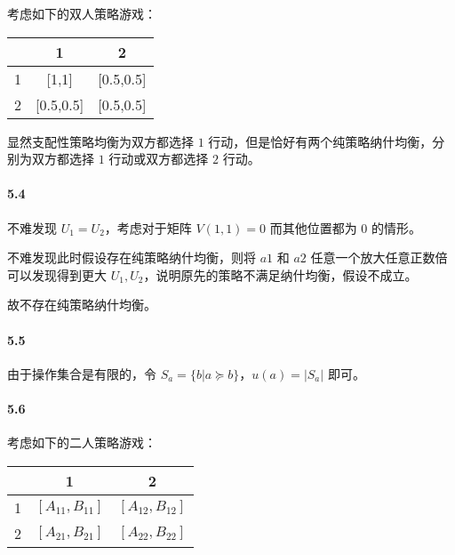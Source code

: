 \documentclass[12pt, a4paper, oneside]{ctexart}
\begin{document}
	 考虑如下的双人策略游戏：
	 
	 \begin{table}[htbp]
	 	\centering
	 	\begin{tabular}{|c|c|c|}
	 		\toprule
	 		& 1     & 2 \\
	 		\midrule
	 		1     & [1,1] & [0.5,0.5] \\
	 		\midrule
	 		2     & [0.5,0.5] & [0.5,0.5] \\
	 		\bottomrule
	 	\end{tabular}%
	 	\label{tab:addlabel}%
	 \end{table}%
	 
	显然支配性策略均衡为双方都选择 $1$ 行动，但是恰好有两个纯策略纳什均衡，分别为双方都选择 $1$ 行动或双方都选择 $2$ 行动。
	
	\paragraph{5.4} 
	
	不难发现 $U_1=U_2$，考虑对于矩阵 $V(1,1)=0$ 而其他位置都为 $0$ 的情形。
	
	不难发现此时假设存在纯策略纳什均衡，则将 $a1$ 和 $a2$ 任意一个放大任意正数倍可以发现得到更大 $U_1,U_2$，说明原先的策略不满足纳什均衡，假设不成立。
	
	故不存在纯策略纳什均衡。
	
	\paragraph{5.5}
	
	由于操作集合是有限的，令 $S_a=\{b|a\succeq b\}$，$u(a)=|S_a|$ 即可。
	
	\paragraph{5.6}
	
	考虑如下的二人策略游戏：
	\begin{table}[htbp]
		\centering
		\begin{tabular}{|c|c|c|}
			\toprule
			& 1     & 2 \\
			\midrule
			1     & $[A_{11},B_{11}]$ & $[A_{12},B_{12}]$ \\
			\midrule
			2     & $[A_{21},B_{21}]$ & $[A_{22},B_{22}]$ \\
			\bottomrule
		\end{tabular}%
		
		\label{tab:addlabel}%
	\end{table}%
	
\end{document}
